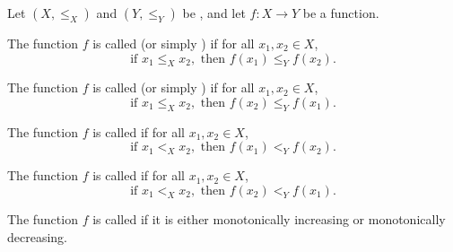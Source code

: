 \begin{definition} \label{definition:monotone_function_between_ordered_sets}
    Let $(X, \leq_X)$ and $(Y, \leq_Y)$ be , and let $f : X \to Y$ be a function.

    The function $f$ is called  (or simply ) if for all $x_1, x_2 \in X$,
    $$\text{if } x_1 \leq_X x_2, \text{ then } f(x_1) \leq_Y f(x_2).$$

    The function $f$ is called  (or simply ) if for all $x_1, x_2 \in X$,
    $$\text{if } x_1 \leq_X x_2, \text{ then } f(x_2) \leq_Y f(x_1).$$

    The function $f$ is called  if for all $x_1, x_2 \in X$,
    $$\text{if } x_1 <_X x_2, \text{ then } f(x_1) <_Y f(x_2).$$

    The function $f$ is called  if for all $x_1, x_2 \in X$,
    $$\text{if } x_1 <_X x_2, \text{ then } f(x_2) <_Y f(x_1).$$

    The function $f$ is called  if it is either monotonically increasing or monotonically decreasing.
\end{definition}
